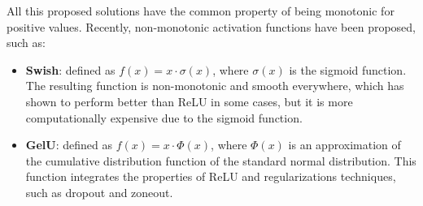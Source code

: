 All this proposed solutions have the common property of being monotonic for positive values. Recently,
non-monotonic activation functions have been proposed, such as:
\begin{itemize}
    \item \textbf{Swish}: defined as $f(x) = x \cdot \sigma(x)$, where $\sigma(x)$ is the sigmoid function.
    The resulting function is non-monotonic and smooth everywhere, which has shown to perform better than ReLU in some cases, but 
    it is more computationally expensive due to the sigmoid function.
    \item \textbf{GelU}: defined as $f(x) = x \cdot \Phi(x)$, where $\Phi(x)$ is an approximation of the cumulative 
    distribution function of the standard normal distribution.
    This function integrates the properties of ReLU and regularizations techniques, such as dropout and zoneout.
\end{itemize}
